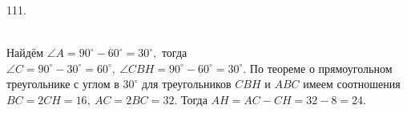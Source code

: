 111. \begin{figure}[ht!]
\end{figure}\\
Найдём $\angle A=90^\circ-60^\circ=30^\circ,$ тогда $\angle C=90^\circ-30^\circ=60^\circ,\ \angle CBH=90^\circ-60^\circ=30^\circ.$ По теореме о прямоугольном треугольнике с углом в $30^\circ$ для треугольников $CBH$ и $ABC$ имеем соотношения $BC=2CH=16,\ AC=2BC=32.$ Тогда $AH=AC-CH=32-8=24.$\\
